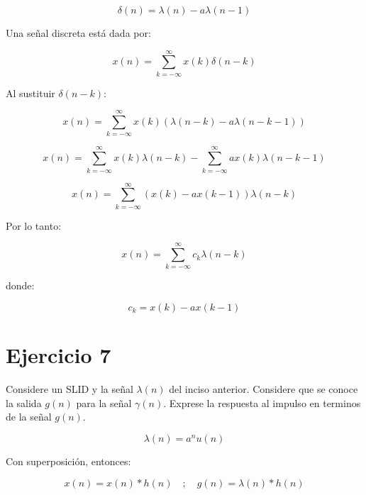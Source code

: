 \documentclass[12pt,a4paper]{article}
\begin{document}
\begin{equation}
\delta(n) = \lambda(n) - a \lambda(n-1)
\end{equation}

Una señal discreta está dada por:

\begin{equation}
x(n) = \sum_{k=-\infty}^{\infty} x(k) \delta(n-k)
\end{equation}

Al sustituir $\delta(n-k)$:

\begin{equation}
x(n) = \sum_{k=-\infty}^{\infty} x(k)(\lambda(n-k) - a \lambda(n-k-1))
\end{equation}

\begin{equation}
x(n) = \sum_{k=-\infty}^{\infty} x(k)\lambda(n-k) - \sum_{k=-\infty}^{\infty} a x(k)\lambda(n-k-1)
\end{equation}

\begin{equation}
x(n) = \sum_{k=-\infty}^{\infty} (x(k) - a x(k-1)) \lambda(n-k)
\end{equation}

Por lo tanto:

\begin{equation}
x(n) = \sum_{k=-\infty}^{\infty} c_k \lambda(n-k)
\end{equation}

donde:

\begin{equation}
\boxed{c_k = x(k) - a x(k-1)}
\end{equation}

\section*{Ejercicio 7}

Considere un SLID y la señal $\lambda(n)$ del inciso anterior. Considere que se conoce la salida $g(n)$ 
para la señal $\gamma(n)$. Exprese la respuesta al impulso en terminos de la señal $g(n)$.

\begin{equation}
\lambda(n) = a^n u(n)
\end{equation}

Con superposición, entonces:

\begin{equation}
x(n) = x(n) * h(n) \quad ; \quad g(n) = \lambda(n) * h(n)
\end{equation}
\end{document}
